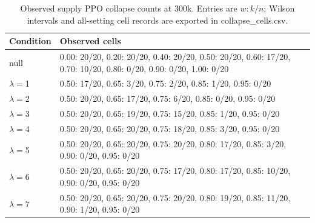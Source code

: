 \begin{table}[t]
\caption{Observed supply PPO collapse counts at 300k. Entries are $w:k/n$; Wilson intervals and all-setting cell records are exported in collapse\_cells.csv.}
\label{tab:observed_cells}
\centering\small
\begin{tabular}{@{}lp{}@{}}
\toprule
Condition & Observed cells \\
\midrule
null & 0.00: 20/20, 0.20: 20/20, 0.40: 20/20, 0.50: 20/20, 0.60: 17/20, 0.70: 10/20, 0.80: 0/20, 0.90: 0/20, 1.00: 0/20 \\
$\lambda=$1 & 0.50: 17/20, 0.65: 3/20, 0.75: 2/20, 0.85: 1/20, 0.95: 0/20 \\
$\lambda=$2 & 0.50: 20/20, 0.65: 17/20, 0.75: 6/20, 0.85: 0/20, 0.95: 0/20 \\
$\lambda=$3 & 0.50: 20/20, 0.65: 19/20, 0.75: 15/20, 0.85: 1/20, 0.95: 0/20 \\
$\lambda=$4 & 0.50: 20/20, 0.65: 20/20, 0.75: 18/20, 0.85: 3/20, 0.95: 0/20 \\
$\lambda=$5 & 0.50: 20/20, 0.65: 20/20, 0.75: 20/20, 0.80: 17/20, 0.85: 3/20, 0.90: 0/20, 0.95: 0/20 \\
$\lambda=$6 & 0.50: 20/20, 0.65: 20/20, 0.75: 17/20, 0.80: 17/20, 0.85: 10/20, 0.90: 0/20, 0.95: 0/20 \\
$\lambda=$7 & 0.50: 20/20, 0.65: 20/20, 0.75: 20/20, 0.80: 19/20, 0.85: 11/20, 0.90: 1/20, 0.95: 0/20 \\
\bottomrule
\end{tabular}
\end{table}
